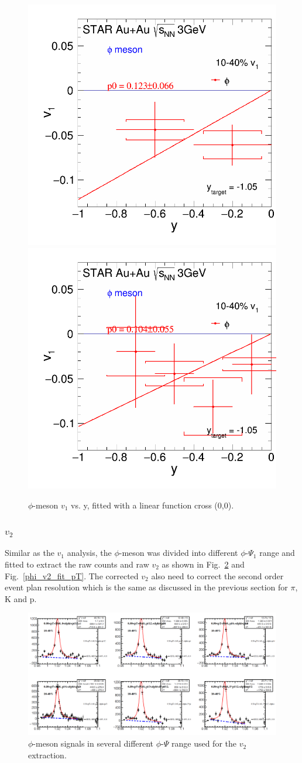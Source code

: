 \begin{figure}[h]
\includegraphics[width=0.49\linewidth]{chapterY/fig/fig1_phi_v1Slop1_10_40.png}
\includegraphics[width=0.49\linewidth]{chapterY/fig/fig1_phi_v1Slop11_10_40.png}
  \caption{$\phi$-meson $v_1$ vs. y, fitted with a linear function cross (0,0).}
\label{phi_dv1dy}
\end{figure}

\subsubsection{$v_2$}

Similar as the $v_1$ analysis, the $\phi$-meson was divided into different $\phi$-$\Psi_{1}$ range and fitted to extract the raw counts and raw $v_2$ as shown in Fig.~\ref{phi_v2} and Fig.~\ref{phi_v2_fit_pT}. The corrected $v_2$ also need to correct the second order event plan resolution which is the same as discussed in the previous section for $\pi$, K and p.

\begin{figure}[h]
\includegraphics[width=0.98\linewidth]{chapterY/fig/phi_invEP_v2_10_40.png}
\caption{$\phi$-meson signals in several different $\phi$-$\Psi$ range used for the $v_2$ extraction.}
\label{phi_v2}
\end{figure}

